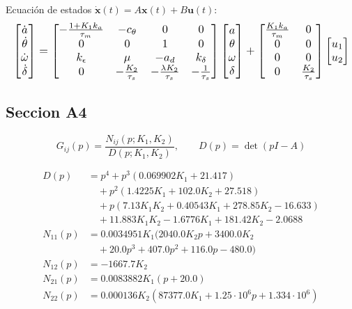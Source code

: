 \documentclass[article, 11pt]{IEEEtran}   %
\begin{document}
Ecuaci\'on de estados $\dot{\mathbf{x}}(t)=A\mathbf{x}(t)+B\mathbf{u}(t)$:
\begin{equation*}
\resizebox{\columnwidth}{!}{$
\begin{bmatrix}\dot a\\\dot\theta\\\dot\omega\\\dot\delta\end{bmatrix}=
\begin{bmatrix}
-\frac{1+K_1k_a}{\tau_m} & -c_\theta & 0 & 0\\
0 & 0 & 1 & 0\\
k_\epsilon & \mu & -a_d & k_\delta\\
0 & -\frac{K_2}{\tau_s} & -\frac{\lambda K_2}{\tau_s} & -\frac{1}{\tau_s}
\end{bmatrix}
\begin{bmatrix}a\\\theta\\\omega\\\delta\end{bmatrix}+
\begin{bmatrix}
\frac{K_1k_a}{\tau_m} & 0\\
0 & 0\\
0 & 0\\
0 & \frac{K_2}{\tau_s}
\end{bmatrix}
\begin{bmatrix}u_1\\u_2\end{bmatrix}
$}
\end{equation*}

\subsection{Seccion A4}
\begin{equation*}
G_{ij}(p)=\frac{N_{ij}(p;K_1,K_2)}{D(p;K_1,K_2)},\qquad D(p)=\det(pI-A)
\end{equation*}

\begin{align*}
D(p)&=p^4+p^3(0.069902K_1+21.417)\\
&\quad+p^2(1.4225K_1+102.0K_2+27.518)\\
&\quad+p(7.13K_1K_2+0.40543K_1+278.85K_2-16.633)\\
&\quad+11.883K_1K_2-1.6776K_1+181.42K_2-2.0688\\
N_{11}(p)&=0.0034951K_1(2040.0K_2p+3400.0K_2\\
&\quad+20.0p^3+407.0p^2+116.0p-480.0)\\
N_{12}(p)&=-1667.7K_2\\
N_{21}(p)&=0.0083882K_1(p+20.0)\\
N_{22}(p)&=0.000136K_2(87377.0K_1+1.25\cdot10^{6}p+1.334\cdot10^{6})
\end{align*}
\end{document}
